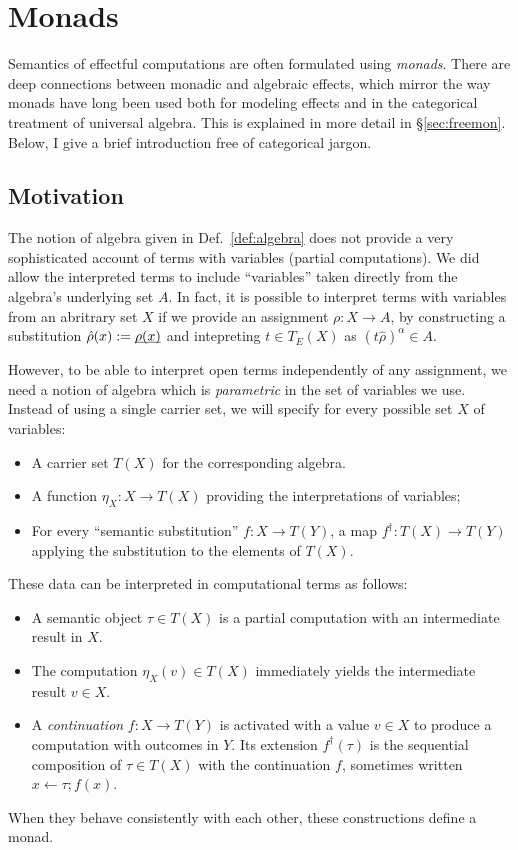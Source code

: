 \documentclass[11pt,oneside,draft]{book}
\theoremstyle{definition}
\newcommand{\ul}[1]{%
  \underline{\smash{#1}}
}
\begin{document}


\section{Monads} \label{sec:eff:mon} %

Semantics of effectful computations
are often formulated using \emph{monads}.
There are deep connections between
monadic and algebraic effects,
which mirror the way monads have long been used
both for modeling effects and
in the categorical treatment of universal algebra.
This is explained in more detail in \S\ref{sec:freemon}.
Below, I give a brief introduction
free of categorical jargon.

\subsection{Motivation} %

The notion of algebra
given in Def.~\ref{def:algebra}
does not provide a very sophisticated account
of terms with variables
(partial computations).
We did allow the interpreted terms to include ``variables''
taken directly from the algebra's underlying set $A$.
In fact, it is possible to interpret
terms with variables from an abritrary set $X$
if we provide an assignment $\rho : X \rightarrow A$,
by constructing a substitution $\hat{\rho}(x) := \ul{\rho(x)}$
and intepreting $t \in T_E(X)$ as $(t \hat{\rho})^\alpha \in A$.

However,
to be able to interpret open terms
independently of any assignment,
we need a notion of algebra which is \emph{parametric}
in the set of variables we use.
Instead of using a single carrier set,
we will specify for every possible
set $X$ of variables:
\begin{itemize}
  \item A carrier set $T(X)$ for the corresponding algebra.
  \item A function $\eta_X : X \rightarrow T(X)$
    providing the interpretations of variables;
  \item For every ``semantic substitution''
    $f : X \rightarrow T(Y)$,
    a map $f^\dagger : T(X) \rightarrow T(Y)$
    applying the substitution to the elements of $T(X)$.
\end{itemize}
These data can be interpreted in computational terms as follows:
\begin{itemize}
  \item
    A semantic object $\tau \in T(X)$
    is a partial computation
    with an intermediate result in $X$.
  \item
    The computation $\eta_X(v) \in T(X)$
    immediately yields the intermediate result $v \in X$.
  \item
    A \emph{continuation} $f : X \rightarrow T(Y)$
    is activated with a value $v \in X$
    to produce a computation with outcomes in $Y$.
    Its extension $f^\dagger(\tau)$
    is the sequential composition
    of $\tau \in T(X)$
    with the continuation $f$,
    sometimes written
    $x \mathop{\leftarrow} \tau \mathop{;} f(x)$.
\end{itemize}
When they behave consistently with each other,
these constructions define a monad.
\end{document}
